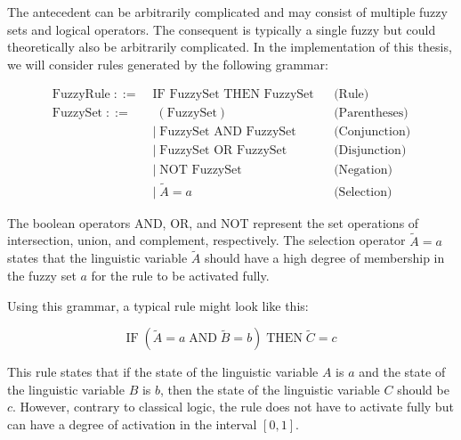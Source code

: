 The antecedent can be arbitrarily complicated and may consist of multiple fuzzy sets and logical operators. The consequent is typically a single fuzzy but could theoretically also be arbitrarily complicated. In the implementation of this thesis, we will consider rules generated by the following grammar:

\newcommand{\fuzzyset}{\langle \text{fuzzy set} \rangle}

\newcommand{\fuzzyrule}{\langle \text{rule} \rangle}

\begin{align*}
      \text{FuzzyRule} \;::=\; & \text{IF } \text{FuzzySet } \text{THEN } \text{FuzzySet} &  & \text{(Rule)}        \\[10pt]
      \text{FuzzySet} \;::=\;  & \; (\text{FuzzySet})                                     &  & \text{(Parentheses)} \\
                               & | \;\text{FuzzySet } \text{AND } \text{FuzzySet}         &  & \text{(Conjunction)} \\
                               & | \;\text{FuzzySet } \text{OR } \text{FuzzySet}          &  & \text{(Disjunction)} \\
                               & | \;\text{NOT } \text{FuzzySet}                          &  & \text{(Negation)}    \\
                               & | \;\tilde{A} = a                                        &  & \text{(Selection)}
\end{align*}

The boolean operators AND, OR, and NOT represent the set operations of intersection, union, and complement, respectively. The selection operator $\tilde{A} = a$ states that the linguistic variable $\tilde{A}$ should have a high degree of membership in the fuzzy set $a$ for the rule to be activated fully.


Using this grammar, a typical rule might look like this:

\begin{equation*}
      \text{IF} \;( \tilde{A} = a \; \text{AND} \; \tilde{B} = b )\; \text{THEN} \; \tilde{C} = c
\end{equation*}

This rule states that if the state of the linguistic variable $A$ is $a$ and the state of the linguistic variable $B$ is $b$, then the state of the linguistic variable $C$ should be $c$. However, contrary to classical logic, the rule does not have to activate fully but can have a degree of activation in the interval $[0, 1]$.

